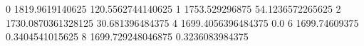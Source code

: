 0 1819.9619140625 120.5562744140625
1 1753.529296875 54.1236572265625
2 1730.0870361328125 30.681396484375
4 1699.4056396484375 0.0
6 1699.74609375 0.3404541015625
8 1699.729248046875 0.3236083984375
